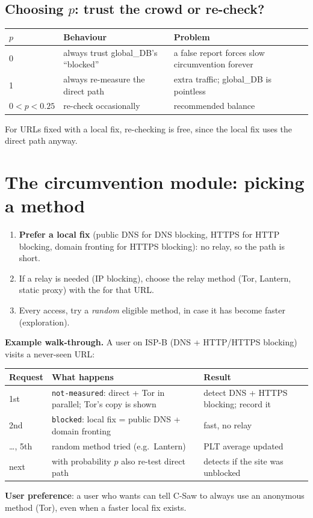 \subsection{Choosing $p$: trust the crowd or re-check?}
\begin{center}
\begin{tabular}{@{}lll@{}}
\toprule
$p$ & Behaviour & Problem\\
\midrule
0 & always trust global\_DB's ``blocked'' & a false report forces slow circumvention forever\\
1 & always re-measure the direct path & extra traffic; global\_DB is pointless\\
$0 < p < 0.25$ & re-check occasionally & recommended balance\\
\bottomrule
\end{tabular}
\end{center}
For URLs fixed with a local fix, re-checking is free, since the local fix uses the direct path anyway.

\section{The circumvention module: picking a method}

\begin{keybox}
\begin{enumerate}
  \item \textbf{Prefer a local fix} (public DNS for DNS blocking, HTTPS for HTTP blocking, domain fronting for HTTPS blocking): no relay, so the path is
        short.
  \item If a relay is needed (IP blocking), choose the relay method (Tor, Lantern, static proxy) with the  for that URL.
  \item Every  access, try a \emph{random} eligible method, in case it has become faster (exploration).
\end{enumerate}
\end{keybox}

\textbf{Example walk-through.} A user on ISP-B (DNS + HTTP/HTTPS blocking) visits a never-seen URL:
\begin{center}
\small
\begin{tabular}{@{}lll@{}}
\toprule
Request & What happens & Result\\
\midrule
1st & \texttt{not-measured}: direct + Tor in parallel; Tor's copy is shown & detect DNS + HTTPS blocking; record it\\
2nd & \texttt{blocked}: local fix = public DNS + domain fronting & fast, no relay\\
\dots, 5th & random method tried (e.g.\ Lantern) & PLT average updated\\
next & with probability $p$ also re-test direct path & detects if the site was unblocked\\
\bottomrule
\end{tabular}
\end{center}
\textbf{User preference}: a user who wants  can tell C-Saw to always use an anonymous method (Tor), even when a faster local fix exists.

